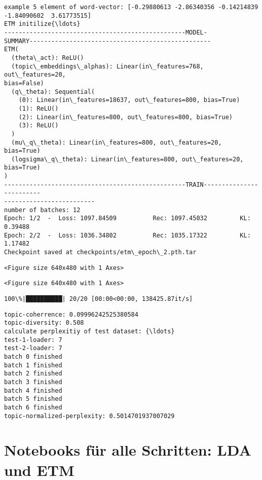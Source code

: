 \documentclass[11pt]{article}
\begin{document}
    \begin{Verbatim}[commandchars=\\\{\}]
example 5 element of word-vector: [-0.29880613 -2.86340356 -0.14214839
-1.84090602  3.61773515]
ETM initilize{\ldots}
--------------------------------------------------MODEL-
SUMMARY--------------------------------------------------
ETM(
  (theta\_act): ReLU()
  (topic\_embeddings\_alphas): Linear(in\_features=768, out\_features=20,
bias=False)
  (q\_theta): Sequential(
    (0): Linear(in\_features=18637, out\_features=800, bias=True)
    (1): ReLU()
    (2): Linear(in\_features=800, out\_features=800, bias=True)
    (3): ReLU()
  )
  (mu\_q\_theta): Linear(in\_features=800, out\_features=20, bias=True)
  (logsigma\_q\_theta): Linear(in\_features=800, out\_features=20, bias=True)
)
--------------------------------------------------TRAIN-------------------------
-------------------------
number of batches: 12
Epoch: 1/2  -  Loss: 1097.84509          Rec: 1097.45032         KL: 0.39488
Epoch: 2/2  -  Loss: 1036.34802          Rec: 1035.17322         KL: 1.17482
Checkpoint saved at checkpoints/etm\_epoch\_2.pth.tar
\end{Verbatim}

    
    \begin{verbatim}
<Figure size 640x480 with 1 Axes>
    \end{verbatim}

    
    
    \begin{verbatim}
<Figure size 640x480 with 1 Axes>
    \end{verbatim}

    
    \begin{Verbatim}[commandchars=\\\{\}]
100\%|██████████| 20/20 [00:00<00:00, 138425.87it/s]
\end{Verbatim}

    \begin{Verbatim}[commandchars=\\\{\}]
topic-coherrence: 0.09996242525380584
topic-diversity: 0.508
calculate perplexitiy of test dataset: {\ldots}
test-1-loader: 7
test-2-loader: 7
batch 0 finished
batch 1 finished
batch 2 finished
batch 3 finished
batch 4 finished
batch 5 finished
batch 6 finished
topic-normalized-perplexity: 0.5014701937007029
\end{Verbatim}

    \hypertarget{notebooks-fuxfcr-alle-schritten-lda-und-etm}{%
\section{\texorpdfstring{\textbf{Notebooks für alle Schritten: LDA und
ETM}}{Notebooks für alle Schritten: LDA und ETM}}\label{notebooks-fuxfcr-alle-schritten-lda-und-etm}}
\end{document}

